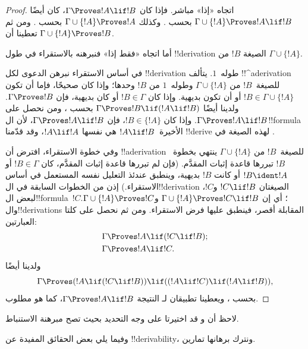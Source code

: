 \documentclass[../../../include/open-logic-section]{subfiles}
\begin{document}
\begin{proof}
اتجاه «إذا» مباشر. فإذا كان $\Gamma \Proves !A \lif !B$، كان أيضًا
$\Gamma \cup \{!A\} \Proves !A \lif !B$ بحسب
. وكذلك $\Gamma \cup \{!A\} \Proves !A$
بحسب . ومن ثم تعطينا  أن
$\Gamma \cup \{!A\} \Proves !B$.

أما اتجاه «فقط إذا» فنبرهنه بالاستقراء في طول !!{derivation} الصيغة
$!B$ من $\Gamma \cup \{!A\}$.

في أساس الاستقراء نبرهن الدعوى لكل !!{derivation} طوله~$1$.
يتألف !!^a{derivation} للصيغة~$!B$ من $\Gamma \cup \{!A\}$ وطوله~$1$
من $!B$ وحدها؛ وإذا كان صحيحًا، فإما أن تكون
$!B \in \Gamma \cup \{!A\}$ أو أن تكون بديهية. وإذا كان $!B \in \Gamma$
أو كان بديهية، فإن $\Gamma \Proves !B$. ولدينا أيضًا $\Gamma
\Proves !B \lif (!A \lif !B)$ بحسب ، ومن
 نحصل على $\Gamma \Proves !A \lif !B$. وإذا كان
$!B \in \{ !A\}$، فإن $\Gamma \Proves !A \lif !B$، لأن ال!!{formula}
الأخيرة~$!A \lif !B$ هي نفسها $!A \lif !A$، وقد قدّمنا !!{derive}
لهذه الصيغة في .

وفي خطوة الاستقراء، افترض أن !!a{derivation} للصيغة~$!B$ من
$\Gamma \cup \{!A\}$ ينتهي بخطوة~$!B$ تبررها قاعدة إثبات المقدَّم.
(فإن لم تبررها قاعدة إثبات المقدَّم، كان $!B \in \Gamma$ أو $!B
\ident !A$ أو كانت $!B$ بديهية، وينطبق عندئذ التعليل نفسه المستعمل في
أساس الاستقراء.) إذن من الخطوات السابقة في ال!!{derivation} الصيغتان
$!C \lif !B$ و$!C$، لبعض ال!!{formula}~$!C$؛ أي إن
$\Gamma \cup \{!A\} \Proves !C \lif !B$ و$\Gamma \cup \{!A\}
\Proves !C$. وال!!{derivation}s المقابلة أقصر، فينطبق عليها فرض
الاستقراء. ومن ثم نحصل على كلتا العبارتين:
\begin{align*}
  & \Gamma \Proves !A \lif (!C \lif !B); \\
  & \Gamma \Proves !A \lif !C.
\end{align*}
ولدينا أيضًا
\[
\Gamma \Proves (!A \lif (!C \lif !B)) \lif
((!A\lif !C)  \lif (!A \lif !B)),
\]
بحسب ، ويعطينا تطبيقان لـ النتيجة
$\Gamma \Proves !A \lif !B$، كما هو مطلوب.
\end{proof}

لاحظ أن  و قد اختيرتا على وجه
التحديد بحيث تصح مبرهنة الاستنباط.

وفيما يلي بعض الحقائق المفيدة عن !!{derivability}، ونترك برهانها تمارين.
\end{document}
